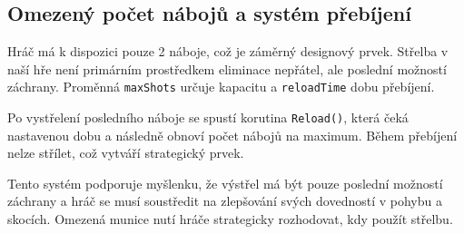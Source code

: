 \subsection{Omezený počet nábojů a systém přebíjení}

Hráč má k dispozici pouze 2 náboje, což je záměrný designový prvek. Střelba v naší hře není primárním prostředkem eliminace nepřátel, ale poslední možností záchrany. Proměnná \texttt{maxShots} určuje kapacitu a \texttt{reloadTime} dobu přebíjení.

Po vystřelení posledního náboje se spustí korutina \texttt{Reload()}, která čeká nastavenou dobu a následně obnoví počet nábojů na maximum. Během přebíjení nelze střílet, což vytváří strategický prvek.

Tento systém podporuje myšlenku, že výstřel má být pouze poslední možností záchrany a hráč se musí soustředit na zlepšování svých dovedností v pohybu a skocích. Omezená munice nutí hráče strategicky rozhodovat, kdy použít střelbu.